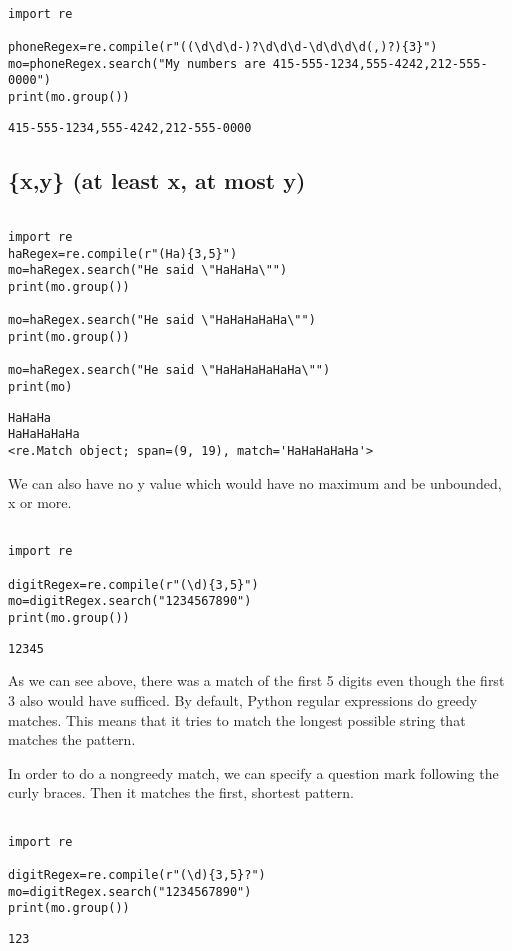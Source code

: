 \documentclass[11pt]{article}
\begin{document}
\begin{verbatim}

import re

phoneRegex=re.compile(r"((\d\d\d-)?\d\d\d-\d\d\d\d(,)?){3}")
mo=phoneRegex.search("My numbers are 415-555-1234,555-4242,212-555-0000")
print(mo.group())

\end{verbatim}

\begin{verbatim}
415-555-1234,555-4242,212-555-0000
\end{verbatim}

\subsection{\{x,y\} (at least x, at most y)}
\label{sec:org75fc770}


\begin{verbatim}

import re
haRegex=re.compile(r"(Ha){3,5}")
mo=haRegex.search("He said \"HaHaHa\"")
print(mo.group())

mo=haRegex.search("He said \"HaHaHaHaHa\"")
print(mo.group())

mo=haRegex.search("He said \"HaHaHaHaHaHa\"")
print(mo)

\end{verbatim}

\begin{verbatim}
HaHaHa
HaHaHaHaHa
<re.Match object; span=(9, 19), match='HaHaHaHaHa'>
\end{verbatim}


We can also have no y value which would have no maximum and be unbounded, x or more.

\begin{verbatim}

import re

digitRegex=re.compile(r"(\d){3,5}")
mo=digitRegex.search("1234567890")
print(mo.group())

\end{verbatim}

\begin{verbatim}
12345
\end{verbatim}


As we can see above, there was a match of the first 5 digits even though the first 3 also would have sufficed. By default, Python regular expressions do greedy matches. This means that it tries to match the longest possible string that matches the pattern.

In order to do a nongreedy match, we can specify a question mark following the curly braces. Then it matches the first, shortest pattern.

\begin{verbatim}

import re

digitRegex=re.compile(r"(\d){3,5}?")
mo=digitRegex.search("1234567890")
print(mo.group())

\end{verbatim}

\begin{verbatim}
123
\end{verbatim}
\end{document}
